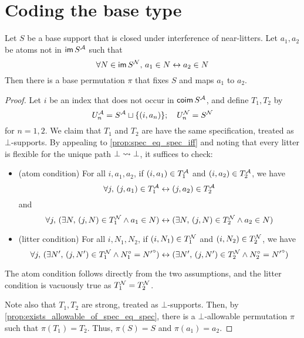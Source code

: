 \section{Coding the base type}
\begin{proposition}
  \label{prop:exists_swap}
  Let \( S \) be a base support that is closed under interference of near-litters.
  Let \( a_1, a_2 \) be atoms not in \( \operatorname{\mathsf{im}} S^{\mathcal A} \) such that
  \[ \forall N \in \operatorname{\mathsf{im}} S^{\mathcal N},\, a_1 \in N \leftrightarrow a_2 \in N \]
  Then there is a base permutation \( \pi \) that fixes \( S \) and maps \( a_1 \) to \( a_2 \).
\end{proposition}
\begin{proof}
  Let \( i \) be an index that does not occur in \( \operatorname{\mathsf{coim}} S^{\mathcal A} \), and define \( T_1, T_2 \) by
  \[ U_n^{\mathcal A} = S^{\mathcal A} \sqcup \{ (i, a_n) \};\quad U_n^{\mathcal N} = S^{\mathcal N} \]
  for \( n = 1, 2 \).
  We claim that \( T_1 \) and \( T_2 \) are have the same specification, treated as \( \bot \)-supports.
  By appealing to \cref{prop:spec_eq_spec_iff} and noting that every litter is flexible for the unique path \( \bot \rightsquigarrow \bot \), it suffices to check:
  \begin{itemize}
    \item (atom condition) For all \( i, a_1, a_2 \), if \( (i, a_1) \in T_1^{\mathcal A} \) and \( (i, a_2) \in T_2^{\mathcal A} \), we have
    \[ \forall j,\, (j, a_1) \in T_1^{\mathcal A} \leftrightarrow (j, a_2) \in T_2^{\mathcal A} \]
    and
    \[ \forall j,\, (\exists N,\, (j, N) \in T_1^{\mathcal N} \wedge a_1 \in N) \leftrightarrow (\exists N,\, (j, N) \in T_2^{\mathcal N} \wedge a_2 \in N) \]
    \item (litter condition) For all \( i, N_1, N_2 \), if \( (i, N_1) \in T_1^{\mathcal N} \) and \( (i, N_2) \in T_2^{\mathcal N} \), we have
    \[ \forall j,\, (\exists N',\, (j, N') \in T_1^{\mathcal N} \wedge N_1^\circ = {N'}^\circ) \leftrightarrow (\exists N',\, (j, N') \in T_2^{\mathcal N} \wedge N_2^\circ = {N'}^\circ) \]
  \end{itemize}
  The atom condition follows directly from the two assumptions, and the litter condition is vacuously true as \( T_1^{\mathcal N} = T_2^{\mathcal N} \).

  Note also that \( T_1, T_2 \) are strong, treated as \( \bot \)-supports.
  Then, by \cref{prop:exists_allowable_of_spec_eq_spec}, there is a \( \bot \)-allowable permutation \( \pi \) such that \( \pi(T_1) = T_2 \).
  Thus, \( \pi(S) = S \) and \( \pi(a_1) = a_2 \).
\end{proof}
